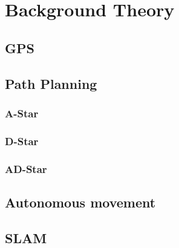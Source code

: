 \section{Background Theory}

\subsection{GPS}

\subsection{Path Planning}

\subsubsection{A-Star}

\subsubsection{D-Star}

\subsubsection{AD-Star}

\subsection{Autonomous movement}

\subsection{SLAM}